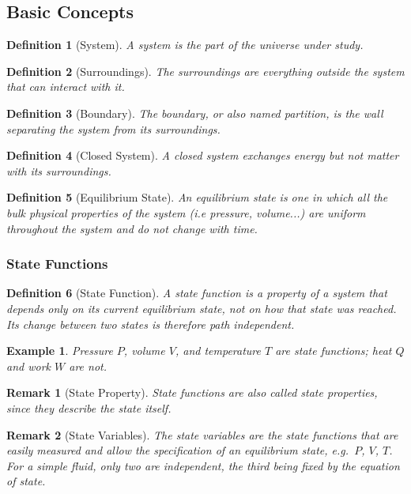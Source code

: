 \documentclass{article}
\newtheorem{definition}{Definition}
\newtheorem{example}{Example}
\newtheorem{remark}{Remark}
\begin{document}
\subsection{Basic Concepts}
\begin{definition}[System]
    A system is the part of the universe under study.
\end{definition}
\begin{definition}[Surroundings]
    The surroundings are everything outside the system that can interact with it.
\end{definition}
\begin{definition}[Boundary]
    The boundary, or also named partition, is the wall separating the system from its surroundings.
\end{definition}
\begin{definition}[Closed System]
    A closed system exchanges energy but not matter with its surroundings.
\end{definition}
\begin{definition}[Equilibrium State]
    An equilibrium state is one in which all the bulk physical properties of the system (i.e pressure, volume...) are uniform throughout the system and do not change with time.
\end{definition}

\subsubsection{State Functions}
\begin{definition}[State Function]
    A state function is a property of a system that depends only on its current equilibrium state, not on how that state was reached. Its change between two states is therefore path independent.
\end{definition}
\begin{example}
    Pressure $P$, volume $V$, and temperature $T$ are state functions; heat $Q$ and work $W$ are not.
\end{example}
\begin{remark}[State Property]
    State functions are also called state properties, since they describe the state itself.
\end{remark}
\begin{remark}[State Variables]
    The state variables are the state functions that are easily measured and allow the specification of an equilibrium state, e.g.\ $P$, $V$, $T$. For a simple fluid, only two are independent, the third being fixed by the equation of state.
\end{remark}
\end{document}
